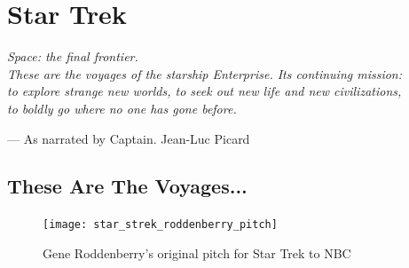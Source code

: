 
\chapter{Star Trek}\label{ch:star trek}

\begin{center}
\textit{Space: the final frontier. \\ These are the voyages of the starship Enterprise. Its continuing mission: \\ to explore strange new worlds, to seek out new life and new civilizations, \\ to boldly go where no one has gone before.}
\end{center}
\begin{flushright}
--- As narrated by Captain. Jean-Luc Picard \\
\parencite{day_boldly_2005}
\end{flushright}


\section{These Are The Voyages...}

\begin{figure}
\texttt{[image: star\_strek\_roddenberry\_pitch]}
\caption{Gene Roddenberry's original pitch for Star Trek to NBC}
\end{figure}

